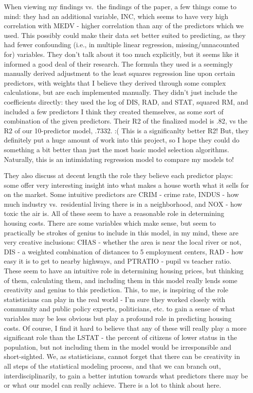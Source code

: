 \documentclass[]{article}
\begin{document}
When viewing my findings vs.~the findings of the paper, a few things
come to mind: they had an additional variable, INC, which seems to have
very high correlation with MEDV - higher correlation than any of the
predictors which we used. This possibly could make their data set better
suited to predicting, as they had fewer confounding (i.e., in multiple
linear regression, missing/unnacounted for) variables. They don't talk
about it too much explicitly, but it seems like it informed a good deal
of their research. The formula they used is a seemingly manually derived
adjustment to the least squares regression line upon certain predictors,
with weights that I believe they derived through some complex
calculations, but are each implemented manually. They didn't just
include the coefficients directly: they used the log of DIS, RAD, and
STAT, squared RM, and included a few predictors I think they created
themselves, as some sort of combination of the given predictors. Their
R2 of the finalized model is .82, vs the R2 of our 10-predictor model,
.7332. :( This is a significanlty better R2! But, they definitely put a
huge amount of work into this project, so I hope they could do something
a bit better than just the most basic model selection algorithms.
Naturally, this is an intimidating regression model to compare my models
to!

They also discuss at decent length the role they believe each predictor
plays: some offer very interesting insight into what makes a house worth
what it sells for on the market. Some intuitive predictors are CRIM -
crime rate, INDUS - how much industry vs.~residential living there is in
a neighborhood, and NOX - how toxic the air is. All of these seem to
have a reasonable role in determining housing costs. There are some
variables which make sense, but seem to practically be strokes of genius
to include in this model, in my mind, these are very creative
inclusions: CHAS - whether the area is near the local river or not, DIS
- a weighted combination of distances to 5 employment centers, RAD - how
easy it is to get to nearby highways, and PTRATIO - pupil vs teacher
ratio. These seem to have an intuitive role in determining housing
prices, but thinking of them, calculating them, and including them in
this model really lends some creativity and genius to this prediction.
This, to me, is inspiring of the role statisticians can play in the real
world - I'm sure they worked closely with community and public policy
experts, politicians, etc. to gain a sense of what variables may be less
obvious but play a profound role in predicting housing costs. Of course,
I find it hard to believe that any of these will really play a more
significant role than the LSTAT - the percent of citizens of lower
status in the population, but not including them in the model would be
irresponsible and short-sighted. We, as statisticians, cannot forget
that there can be creativity in all steps of the statistical modeling
process, and that we can branch out, interdisciplinarily, to gain a
better intution towards what predictors there may be or what our model
can really achieve. There is a lot to think about here.
\end{document}

